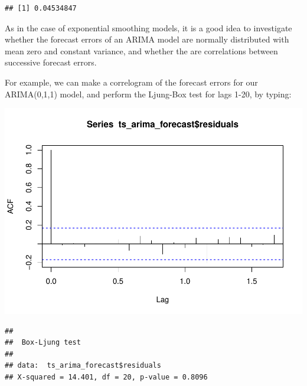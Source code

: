 \documentclass[
]{article}
\newenvironment{Shaded}{\begin{snugshade}}{\end{snugshade}}
\newcommand{\DataTypeTok}[1]{\textcolor[rgb]{0.13,0.29,0.53}{#1}}
\newcommand{\DecValTok}[1]{\textcolor[rgb]{0.00,0.00,0.81}{#1}}
\newcommand{\KeywordTok}[1]{\textcolor[rgb]{0.13,0.29,0.53}{\textbf{#1}}}
\newcommand{\NormalTok}[1]{#1}
\newcommand{\OperatorTok}[1]{\textcolor[rgb]{0.81,0.36,0.00}{\textbf{#1}}}
\newcommand{\StringTok}[1]{\textcolor[rgb]{0.31,0.60,0.02}{#1}}
\begin{document}
\begin{verbatim}
## [1] 0.04534847
\end{verbatim}

As in the case of exponential smoothing models, it is a good idea to
investigate whether the forecast errors of an ARIMA model are normally
distributed with mean zero and constant variance, and whether the are
correlations between successive forecast errors.

For example, we can make a correlogram of the forecast errors for our
ARIMA(0,1,1) model, and perform the Ljung-Box test for lags 1-20, by
typing:

\begin{Shaded}
\end{Shaded}

\includegraphics{tsf_export_files/figure-latex/unnamed-chunk-27-1.pdf}

\begin{Shaded}
\end{Shaded}

\begin{verbatim}
## 
##  Box-Ljung test
## 
## data:  ts_arima_forecast$residuals
## X-squared = 14.401, df = 20, p-value = 0.8096
\end{verbatim}
\end{document}
